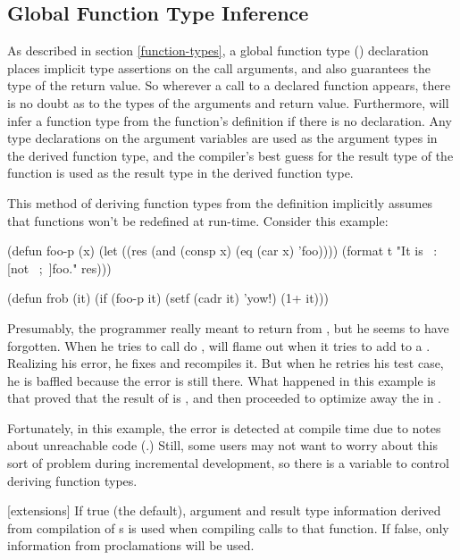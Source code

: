 {\subsection{Global Function Type Inference}
\label{function-type-inference}

As described in section \ref{function-types}, a global function type
() declaration places implicit type assertions on the call arguments,
and also guarantees the type of the return value.  So wherever a call to a
declared function appears, there is no doubt as to the types of the arguments
and return value.  Furthermore, \python{} will infer a function type from the
function's definition if there is no  declaration.  Any type
declarations on the argument variables are used as the argument types in the
derived function type, and the compiler's best guess for the result type of the
function is used as the result type in the derived function type.

This method of deriving function types from the definition implicitly assumes
that functions won't be redefined at run-time.  Consider this example:
\begin{lisp}
(defun foo-p (x)
  (let ((res (and (consp x) (eq (car x) 'foo))))
    (format t "It is ~:[not ~;~]foo." res)))

(defun frob (it)
  (if (foo-p it)
      (setf (cadr it) 'yow!)
      (1+ it)))
\end{lisp}

Presumably, the programmer really meant to return  from , but
he seems to have forgotten.  When he tries to call do 
,  will flame out when it tries to add to
a .  Realizing his error, he fixes  and recompiles it.  But
when he retries his test case, he is baffled because the error is still there.
What happened in this example is that \python{} proved that the result of
 is , and then proceeded to optimize away the  in
.

Fortunately, in this example, the error is detected at compile time due to
notes about unreachable code (.)  Still, some
users may not want to worry about this sort of problem during incremental
development, so there is a variable to control deriving function types.

[extensions]
If true (the default), argument and result type information derived from
compilation of s is used when compiling calls to that function.  If
false, only information from  proclamations will be used.
\enddefvar

}
